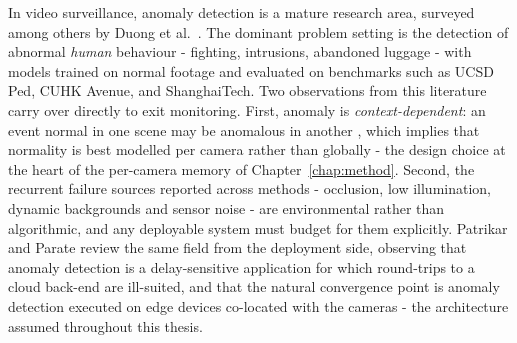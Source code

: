 In video surveillance, anomaly detection is a mature research area, surveyed
among others by Duong et al.~\cite{Duong2023}. The dominant problem setting is
the detection of abnormal \emph{human} behaviour - fighting, intrusions,
abandoned luggage - with models trained on normal footage and evaluated on
benchmarks such as UCSD Ped, CUHK Avenue, and ShanghaiTech. Two observations
from this literature carry over directly to exit monitoring. First, anomaly is
\emph{context-dependent}: an event normal in one scene may be anomalous in
another \cite{Duong2023,Patrikar2022}, which implies that normality is best
modelled per camera rather than globally - the design choice at the heart of
the per-camera memory of Chapter~\ref{chap:method}. Second, the recurrent
failure sources reported across methods - occlusion, low illumination, dynamic
backgrounds and sensor noise \cite{Duong2023} - are environmental rather than
algorithmic, and any deployable system must budget for them explicitly.
Patrikar and Parate \cite{Patrikar2022} review the same field from the
deployment side, observing that anomaly detection is a delay-sensitive
application for which round-trips to a cloud back-end are ill-suited, and that
the natural convergence point is anomaly detection executed on edge devices
co-located with the cameras - the architecture assumed throughout this thesis.

